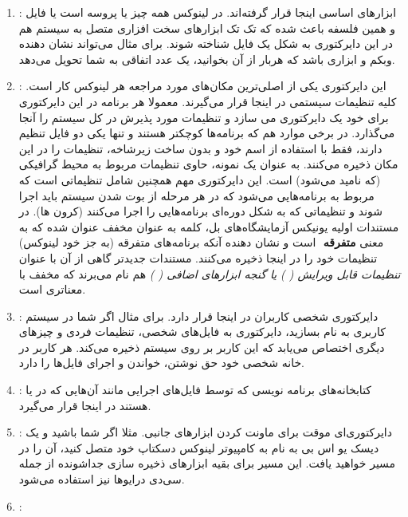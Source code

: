 \begin{enumerate}
\item {\large{}}:
ابزارهای اساسی اینجا قرار گرفته‌اند. در لینوکس همه چیز یا پروسه است یا فایل و همین فلسفه باعث شده که تک تک ابزارهای سخت افزاری متصل به سیستم هم در این دایرکتوری به شکل یک فایل شناخته شوند. برای مثال 
 می‌تواند نشان دهنده وبکم و 
 ابزاری باشد که هربار از آن بخوانید، یک عدد اتفاقی به شما تحویل می‌دهد.
\item {\large{}}:
این دایرکتوری یکی از اصلی‌ترین مکان‌های مورد مراجعه هر لینوکس کار است. کلیه تنظیمات سیستمی در اینجا قرار می‌گیرند. معمولا هر برنامه در این دایرکتوری برای خود یک دایرکتوری می سازد و تنظیمات مورد پذیرش در کل سیستم را آنجا می‌گذارد. در برخی موارد هم که برنامه‌ها کوچکتر هستند و تنها یکی دو فایل تنظیم دارند، فقط با استفاده از اسم خود و بدون ساخت زیرشاخه‌، تنظیمات را در این مکان ذخیره می‌کنند. به عنوان یک نمونه، 
 حاوی تنظیمات مربوط به محیط گرافیکی (که 
 نامید می‌شود) است.
این دایرکتوری مهم همچنین شامل تنظیماتی است که مربوط به برنامه‌هایی می‌شود که در هر مرحله از بوت شدن سیستم باید اجرا شوند و تنظیماتی که به شکل دوره‌ای برنامه‌هایی را اجرا می‌کنند (کرون‌ ها).
در مستندات اولیه یونیکس آزمایشگاه‌های بل، کلمه 
 به عنوان مخفف 
 عنوان شده که به معنی
\textbf{متفرقه}
‌ است و نشان دهنده آنکه برنامه‌های متفرقه (به جز خود لینوکس) تنظیمات خود را در اینجا ذخیره می‌کنند. مستندات جدیدتر گاهی از آن با عنوان
\emph{تنظیمات قابل ویرایش (
) یا گنجه ابزارهای اضافی (
)}
هم نام می‌برند که مخفف با معناتری است.
\item {\large{}}:
دایرکتوری شخصی کاربران در اینجا قرار دارد. برای مثال اگر شما در سیستم کاربری به نام 
 بسازید، دایرکتوری 
 به فایل‌های شخصی، تنظیمات فردی و چیزهای دیگری اختصاص می‌یابد که این کاربر بر روی سیستم ذخیره می‌کند. هر کاربر در خانه شخصی خود حق نوشتن، خواندن و اجرای فایل‌ها را دارد.
\item {\large{}}:
کتابخانه‌های برنامه نویسی که توسط فایل‌های اجرایی مانند آن‌هایی که در 
 یا 
 هستند در اینجا قرار می‌گیرد.
\item {\large{}}:
دایرکتوری‌ای موقت برای ماونت کردن ابزارهای جانبی. مثلا اگر شما 
 باشید و یک دیسک یو اس بی به نام 
 به کامپیوتر لینوکس دسکتاپ خود متصل کنید، آن را در مسیر 
 خواهید یافت. این مسیر برای بقیه ابزارهای ذخیره سازی جداشونده از جمله سی‌دی درایوها نیز استفاده می‌شود.
\item {\large{}}:

\end{enumerate}
